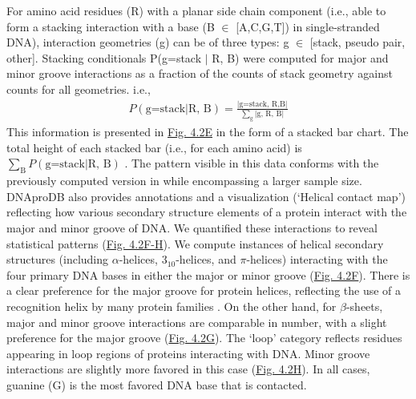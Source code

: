 For amino acid residues (R) with a planar side chain component (i.e., able to form a stacking interaction with a base (B $\in$ [A,C,G,T]) in single-stranded DNA), interaction geometries (g) can be of three types: g $\in$ [stack, pseudo pair, other]. Stacking conditionals P(g=stack $|$ R, B) were computed for major and minor groove interactions as a fraction of the counts of stack geometry against counts for all geometries. i.e.,
\begin{align}
P(\text{g=stack} | \text{R, B})= \frac{|\text{g=stack, R,B}|}{\sum\limits_\text{g}|\text{g, R, B}| }
\end{align}
This information is presented in \hyperref[fig:dnaprodb2]{Fig. 4.2E} in the form of a stacked bar chart. The total height of each stacked bar (i.e., for each amino acid) is $\sum\limits_\text{B}P(\text{g=stack} | \text{R, B})$ . The pattern visible in this data conforms with the previously computed version in \citep{Sagendorf2020} while encompassing a larger sample size.
DNAproDB also provides annotations and a visualization (‘Helical contact map’) reflecting how various secondary structure elements of a protein interact with the major and minor groove of DNA. We quantified these interactions to reveal statistical patterns (\hyperref[fig:dnaprodb2]{Fig. 4.2F-H}). We compute instances of helical secondary structures (including $\alpha$-helices, $3_{10}$-helices, and $\pi$-helices) interacting with the four primary DNA bases in either the major or minor groove (\hyperref[fig:dnaprodb2]{Fig. 4.2F}). There is a clear preference for the major groove for protein helices, reflecting the use of a recognition helix by many protein families \citep{Garvie2001}. On the other hand, for $\beta$-sheets, major and minor groove interactions are comparable in number, with a slight preference for the major groove (\hyperref[fig:dnaprodb2]{Fig. 4.2G}). The ‘loop’ category reflects residues appearing in loop regions of proteins interacting with DNA. Minor groove interactions are slightly more favored in this case (\hyperref[fig:dnaprodb2]{Fig. 4.2H}). In all cases, guanine (G) is the most favored DNA base that is contacted. 

